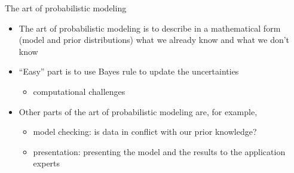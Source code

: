 \documentclass[english,t]{beamer}
\begin{document}
\begin{frame}{The art of probabilistic modeling}

  \begin{itemize}
  \item The art of probabilistic modeling is to describe in a
    mathematical form (model and prior distributions) what we already
    know and what we don't know 
\vspace{\baselineskip}
  \item<2-> ``Easy'' part is to use Bayes rule to update the uncertainties
    \begin{itemize}
    \item computational challenges
    \end{itemize}
\vspace{\baselineskip}
  \item<3-> Other parts of the art of probabilistic modeling are, for example,
    \begin{itemize}
    \item model checking: is data in conflict with our prior knowledge?
    \item presentation: presenting the model and the results to the application experts
    \end{itemize}
  \end{itemize}
\end{frame}
\end{document}

